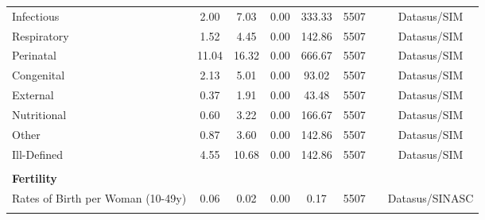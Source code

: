 \begin{table}[H]
\begin{footnotesize}
\begin{center}
{\begin{threeparttable}[b]
\begin{tabular}{rrrrrrrr}
    \multicolumn{1}{l}{Infectious} & \multicolumn{1}{c}{2.00} & \multicolumn{1}{c}{7.03} & \multicolumn{1}{c}{0.00} & \multicolumn{1}{c}{333.33} & \multicolumn{1}{c}{5507} &       & \multicolumn{1}{c}{Datasus/SIM} \\
    \multicolumn{1}{l}{Respiratory} & \multicolumn{1}{c}{1.52} & \multicolumn{1}{c}{4.45} & \multicolumn{1}{c}{0.00} & \multicolumn{1}{c}{142.86} & \multicolumn{1}{c}{5507} &       & \multicolumn{1}{c}{Datasus/SIM} \\
    \multicolumn{1}{l}{Perinatal} & \multicolumn{1}{c}{11.04} & \multicolumn{1}{c}{16.32} & \multicolumn{1}{c}{0.00} & \multicolumn{1}{c}{666.67} & \multicolumn{1}{c}{5507} &       & \multicolumn{1}{c}{Datasus/SIM} \\
    \multicolumn{1}{l}{Congenital} & \multicolumn{1}{c}{2.13} & \multicolumn{1}{c}{5.01} & \multicolumn{1}{c}{0.00} & \multicolumn{1}{c}{93.02} & \multicolumn{1}{c}{5507} &       & \multicolumn{1}{c}{Datasus/SIM} \\
    \multicolumn{1}{l}{External} & \multicolumn{1}{c}{0.37} & \multicolumn{1}{c}{1.91} & \multicolumn{1}{c}{0.00} & \multicolumn{1}{c}{43.48} & \multicolumn{1}{c}{5507} &       & \multicolumn{1}{c}{Datasus/SIM} \\
    \multicolumn{1}{l}{Nutritional} & \multicolumn{1}{c}{0.60} & \multicolumn{1}{c}{3.22} & \multicolumn{1}{c}{0.00} & \multicolumn{1}{c}{166.67} & \multicolumn{1}{c}{5507} &       & \multicolumn{1}{c}{Datasus/SIM} \\
    \multicolumn{1}{l}{Other} & \multicolumn{1}{c}{0.87} & \multicolumn{1}{c}{3.60} & \multicolumn{1}{c}{0.00} & \multicolumn{1}{c}{142.86} & \multicolumn{1}{c}{5507} &       & \multicolumn{1}{c}{Datasus/SIM} \\
    \multicolumn{1}{l}{Ill-Defined} & \multicolumn{1}{c}{4.55} & \multicolumn{1}{c}{10.68} & \multicolumn{1}{c}{0.00} & \multicolumn{1}{c}{142.86} & \multicolumn{1}{c}{5507} &       & \multicolumn{1}{c}{Datasus/SIM} \\
          &       &       &       &       &       &       &  \\
    \multicolumn{1}{l}{\textbf{Fertility}} &       &       &       &       &       &       &  \\
    \multicolumn{1}{l}{Rates of Birth per Woman (10-49y)} & \multicolumn{1}{c}{0.06} & \multicolumn{1}{c}{0.02} & \multicolumn{1}{c}{0.00} & \multicolumn{1}{c}{0.17} & \multicolumn{1}{c}{5507} &       & \multicolumn{1}{c}{Datasus/SINASC} \\
          &       &       &       &       &       &       &  \\

\end{tabular}
\end{threeparttable}}
\end{center}
\end{footnotesize}
\end{table}

